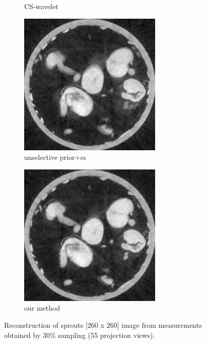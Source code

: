 \documentclass{article}
\begin{document}
\begin{figure}[h]
\begin{subfigure}[b]{0.3\linewidth}
        \caption{CS-wavelet}
     \end{subfigure}
\quad
    \begin{subfigure}[b]{0.3\linewidth}
        \includegraphics[width=\textwidth]{../images/supplementary/2D_sprouts/55_angles/1/plain_pca.png}
        \caption{unselective prior+cs}
     \end{subfigure}
\quad
    \begin{subfigure}[b]{0.3\linewidth}
        \includegraphics[width=\textwidth]{../images/supplementary/2D_sprouts/55_angles/1/weighted_pca5.png}
        \caption{our method}
     \end{subfigure}
     \caption{Reconstruction of sprouts [260 x 260] image from measurements obtained by $30\%$ sampling (55 projection views).} 
\label{fig:joint}
\end{figure}
\end{document}
